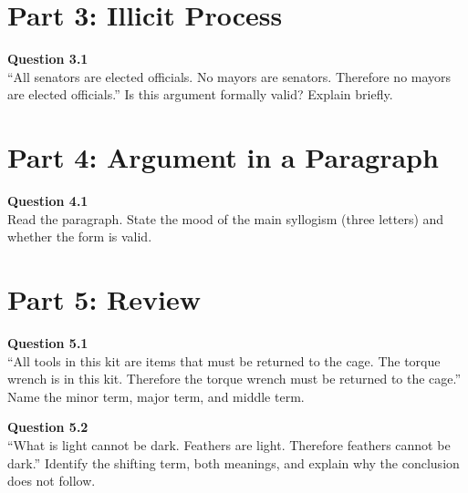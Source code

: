 \documentclass[12pt]{article}
\begin{document}

\newpage

\section*{Part 3: Illicit Process}

\textbf{Question 3.1}\\[-0.15em]
``All senators are elected officials. No mayors are senators. Therefore no mayors are elected officials.'' Is this argument formally valid? Explain briefly.


\newpage

\section*{Part 4: Argument in a Paragraph}

\textbf{Question 4.1}\\[-0.15em]
Read the paragraph. State the mood of the main syllogism (three letters) and whether the form is valid.

\vspace{0.2em}

\noindent{}


\newpage

\section*{Part 5: Review}

\textbf{Question 5.1}\\[-0.15em]
``All tools in this kit are items that must be returned to the cage. The torque wrench is in this kit. Therefore the torque wrench must be returned to the cage.'' Name the minor term, major term, and middle term.


\textbf{Question 5.2}\\[-0.15em]
``What is light cannot be dark. Feathers are light. Therefore feathers cannot be dark.'' Identify the shifting term, both meanings, and explain why the conclusion does not follow.

\end{document}
